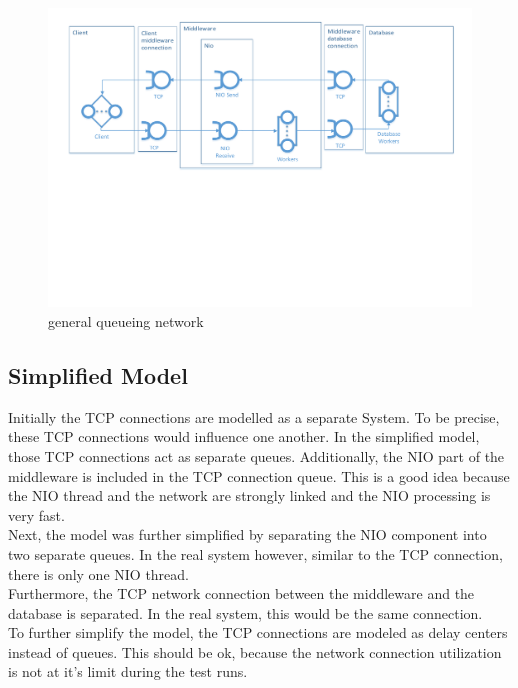 \documentclass[a4paper]{article}
\begin{document}
{\begin{figure}[H]
	\begin{center}
    \includegraphics[scale=0.6, trim = 15mm 94mm 12mm 10mm, clip]{../drawings-ms2le/general-queueing-network.pdf}
  \end{center}
  \caption{general queueing network}
  \label{fig:general-queueing-network}
\end{figure}


\subsection{Simplified Model}

\noindent Initially the TCP connections are modelled as a separate System. To be precise, these TCP connections would influence one another. In the simplified model, those TCP connections act as separate queues. Additionally, the NIO part of the middleware is included in the TCP connection queue. This is a good idea because the NIO thread and the network are strongly linked and the NIO processing is very fast.\\

\noindent Next, the model was further simplified by separating the NIO component into two separate queues. In the real system however, similar to the TCP connection, there is only one NIO thread.\\

\noindent Furthermore, the TCP network connection between the middleware and the database is separated. In the real system, this would be the same connection.\\

\noindent To further simplify the model, the TCP connections are modeled as delay centers instead of queues. This should be ok, because the network connection utilization is not at it's limit during the test runs.\\

}
\end{document}
